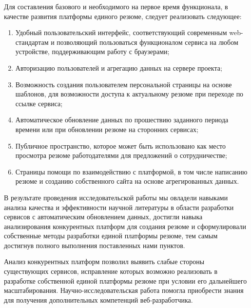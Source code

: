 \documentclass[master, och, pract]{SCWorks}
\begin{document}
Для составления базового и необходимого на первое время функционала, в качестве развития 
платформы единого резюме, следует реализовать следующее:
\begin{enumerate}
    \item Удобный пользовательский интерфейс, соответствующий современным web-стандартам 
    и позволяющий пользоваться функционалом сервиса на любом устройстве, поддерживающим 
    работу с браузерами;
    \item Авторизацию пользователей и агрегацию данных на сервере проекта;
    \item Возможность создания пользователем персональной страницы на основе шаблонов, 
    для возможности доступа к актуальному резюме при переходе по ссылке сервиса;
    \item Автоматическое обновление данных по прошествию заданного периода времени или 
    при обновлении резюме на сторонних сервисах;
    \item Публичное пространство, которое может быть использовано как место просмотра 
    резюме работодателями для предложений о сотрудничестве;
    \item Страницы помощи по взаимодействию с платформой, в том числе написанию резюме 
    и созданию собственного сайта на основе агрегированных данных.
\end{enumerate}


\newpage
\conclusion
В результате проведения исследовательской работы мы овладели навыками анализа качества 
и эффективности научной литературы в области разработки сервисов с автоматическим 
обновлением данных, достигли навыка анализирования конкурентных платформ для 
создания резюме и сформулировали собственные методы разработки единой платформы резюме, 
тем самым достигнув полного выполнения поставленных нами пунктов.

Анализ конкурентных платформ позволил выявить слабые стороны существующих сервисов, 
исправление которых возможно реализовать в разработке собственной единой платформы 
резюме при условии его дальнейшего масштабирования.
Научно-исследовательская работа помогла приобрести знания для получения дополнительных 
компетенций веб-разработчика. 


%






\appendix
\end{document}
